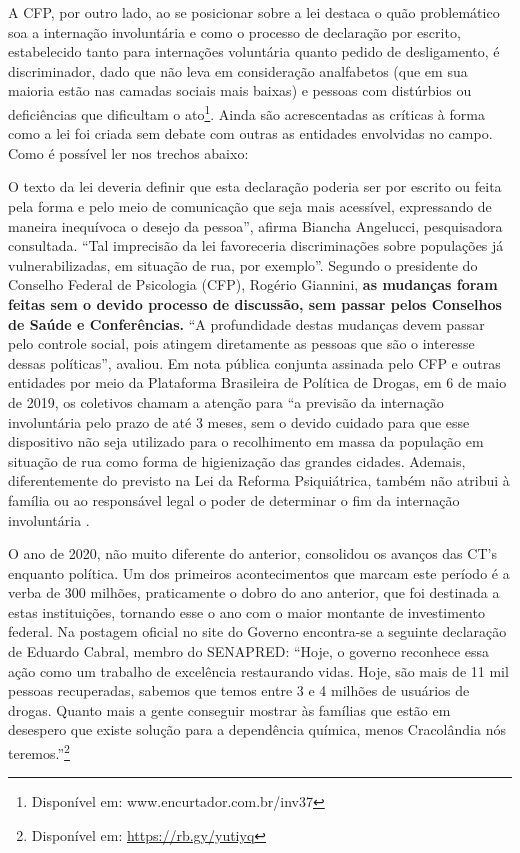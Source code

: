 \documentclass[
	12pt,				%
	oneside,			%
	a4paper,			%
	sumario=tradicional,
	english,			%
	brazil				%
	]{abntex2}
\begin{document}
A CFP, por outro lado, ao se posicionar sobre a lei destaca o quão problemático soa a internação involuntária e como o processo de declaração por escrito, estabelecido tanto para internações voluntária quanto pedido de desligamento, é discriminador, dado que não leva em consideração analfabetos (que em sua maioria estão nas camadas sociais mais baixas) e pessoas com distúrbios ou deficiências que dificultam o ato\footnote{Disponível em: www.encurtador.com.br/inv37}. Ainda são acrescentadas as críticas à forma como a lei foi criada sem debate com outras as entidades envolvidas no campo. Como é possível ler nos trechos abaixo:
\begin{quoting}[rightmargin=0cm,leftmargin=4cm]
\begin{singlespace}
{\footnotesize
O texto da lei deveria definir que esta declaração poderia ser por escrito ou feita pela forma e pelo meio de comunicação que seja mais acessível, expressando de maneira inequívoca o desejo da pessoa”, afirma Biancha Angelucci, pesquisadora consultada. “Tal imprecisão da lei favoreceria discriminações sobre populações já vulnerabilizadas, em situação de rua, por exemplo”. Segundo o presidente do Conselho Federal de Psicologia (CFP), Rogério Giannini, \textbf{as mudanças foram feitas sem o devido processo de discussão, sem passar pelos Conselhos de Saúde e Conferências.} “A profundidade destas mudanças devem passar pelo controle social, pois atingem diretamente as pessoas que são o interesse dessas políticas”, avaliou. Em nota pública conjunta assinada pelo CFP e outras entidades por meio da Plataforma Brasileira de Política de Drogas, em 6 de maio de 2019, os coletivos chamam a atenção para “a previsão da internação involuntária pelo prazo de até 3 meses, sem o devido cuidado para que esse dispositivo não seja utilizado para o recolhimento em massa da população em situação de rua como forma de higienização das grandes cidades. Ademais, diferentemente do previsto na Lei da Reforma Psiquiátrica, também não atribui à família ou ao responsável legal o poder de determinar o fim da internação involuntária \cite[grifo meu]{cfp2019}.}
\end{singlespace}
\end{quoting}
O ano de 2020, não muito diferente do anterior, consolidou os avanços das CT's enquanto política. Um dos primeiros acontecimentos que marcam este período é a verba de 300 milhões, praticamente o dobro do ano anterior, que foi destinada a estas instituições, tornando esse o ano com o maior montante de investimento federal. Na postagem oficial no site do Governo encontra-se a seguinte declaração de Eduardo Cabral, membro do SENAPRED: ``Hoje, o governo reconhece essa ação como um trabalho de excelência restaurando vidas. Hoje, são mais de 11 mil pessoas recuperadas, sabemos que temos entre 3 e 4 milhões de usuários de drogas. Quanto mais a gente conseguir mostrar às famílias que estão em desespero que existe solução para a dependência química, menos Cracolândia nós teremos.''\footnote{Disponível em: \url{https://rb.gy/yutiyq}}
\end{document}
